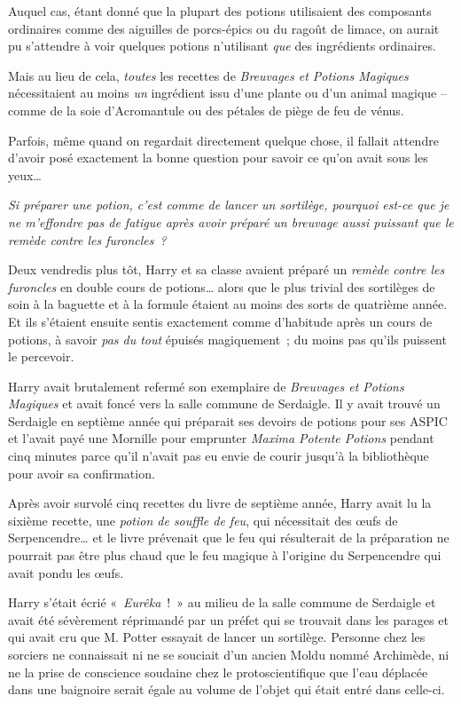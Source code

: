 Auquel cas, étant donné que la plupart des potions utilisaient des composants ordinaires comme des aiguilles de porcs-épics ou du ragoût de limace, on aurait pu s'attendre à voir quelques potions n'utilisant \emph{que} des ingrédients ordinaires.

Mais au lieu de cela, \emph{toutes} les recettes de \emph{Breuvages et Potions Magiques} nécessitaient au moins \emph{un} ingrédient issu d'une plante ou d'un animal magique -- comme de la soie d'Acromantule ou des pétales de piège de feu de vénus.

Parfois, même quand on regardait directement quelque chose, il fallait attendre d'avoir posé exactement la bonne question pour savoir ce qu'on avait sous les yeux…

\emph{Si préparer une potion, c'est comme de lancer un sortilège, pourquoi est-ce que je ne m'effondre pas de fatigue après avoir préparé un breuvage aussi puissant que le remède contre les furoncles~?}

Deux vendredis plus tôt, Harry et sa classe avaient préparé un \emph{remède contre les furoncles} en double cours de potions… alors que le plus trivial des sortilèges de soin à la baguette et à la formule étaient au moins des sorts de quatrième année.
Et ils s'étaient ensuite sentis exactement comme d'habitude après un cours de potions, à savoir \emph{pas du tout} épuisés magiquement~; du moins pas qu'ils puissent le percevoir.

Harry avait brutalement refermé son exemplaire de \emph{Breuvages et Potions Magiques} et avait foncé vers la salle commune de Serdaigle.
Il y avait trouvé un Serdaigle en septième année qui préparait ses devoirs de potions pour ses ASPIC et l'avait payé une Mornille pour emprunter \emph{Maxima Potente Potions} pendant cinq minutes parce qu'il n'avait pas eu envie de courir jusqu'à la bibliothèque pour avoir sa confirmation.

Après avoir survolé cinq recettes du livre de septième année, Harry avait lu la sixième recette, une \emph{potion de souffle de feu}, qui nécessitait des œufs de Serpencendre… et le livre prévenait que le feu qui résulterait de la préparation ne pourrait pas être plus chaud que le feu magique à l'origine du Serpencendre qui avait pondu les œufs.

Harry s'était écrié «~\emph{Eurêka}~!~»
au milieu de la salle commune de Serdaigle et avait été sévèrement réprimandé par un préfet qui se trouvait dans les parages et qui avait cru que M. Potter essayait de lancer un sortilège.
Personne chez les sorciers ne connaissait ni ne se souciait d'un ancien Moldu nommé Archimède, ni ne la prise de conscience soudaine chez le protoscientifique que l'eau déplacée dans une baignoire serait égale au volume de l'objet qui était entré dans celle-ci.

